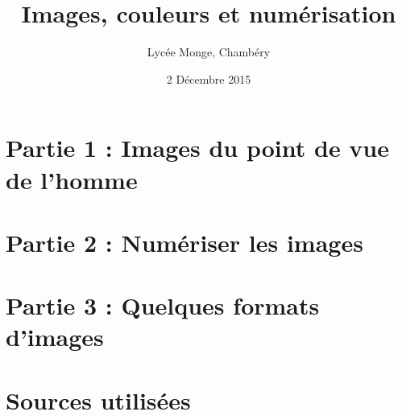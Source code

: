 \documentclass[handout]{beamer}
\begin{document}

\title{Images, couleurs et numérisation} 
\author{Lycée Monge, Chambéry} 
\date{2 Décembre 2015 \\ \bigskip {\tiny \doclicenseThis}} 



\frame{\titlepage} 

\setcounter{tocdepth}{1}



\section{Partie 1 : Images du point de vue de l'homme}  


          

\section{Partie 2 : Numériser les images}  


          

\section{Partie 3 : Quelques formats d'images}  




\section{Sources utilisées}  
\end{document}
